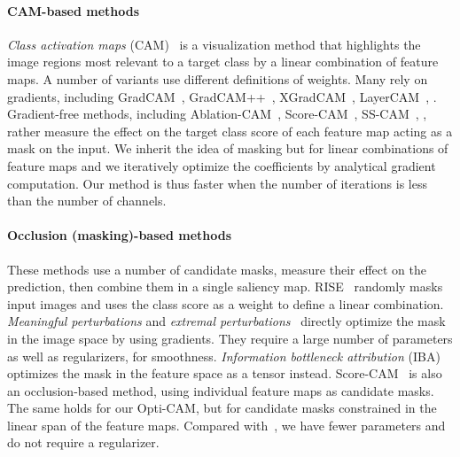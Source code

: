 
\paragraph{CAM-based methods}

\emph{Class activation maps} (CAM)~\citep{zhou2016learning} is a visualization method that highlights the image regions most relevant to a target class by a linear combination of feature maps. A number of variants use different definitions of weights. Many rely on gradients, including GradCAM~\citep{selvaraju2017grad}, GradCAM++~\citep{chattopadhay2018grad}, XGradCAM~\citep{fu2020axiom}, LayerCAM~\citep{jiang2021layercam}, . Gradient-free methods, including Ablation-CAM~\citep{ramaswamy2020ablation}, Score-CAM~\cite{wang2020score}, SS-CAM~\citep{wang2020ss}, , rather measure the effect on the target class score of each feature map acting as a mask on the input. We inherit the idea of masking but for linear combinations of feature maps and we iteratively optimize the coefficients by analytical gradient computation. Our method is thus faster when the number of iterations is less than the number of channels.


\paragraph{Occlusion (masking)-based methods}

These methods use a number of candidate masks, measure their effect on the prediction, then combine them in a single saliency map. RISE~\citep{petsiuk2018rise} randomly masks input images and uses the class score as a weight to define a linear combination. \emph{Meaningful perturbations} \citep{fong2017interpretable} and \emph{extremal perturbations}~\citep{fong2019understanding} directly optimize the mask in the image space by using gradients. They require a large number of parameters as well as regularizers, \eg for smoothness. \emph{Information bottleneck attribution} (IBA)~\citep{schulz2020restricting} optimizes the mask in the feature space as a tensor instead. Score-CAM~\cite{wang2020score} is also an occlusion-based method, using individual feature maps as candidate masks. The same holds for our Opti-CAM, but for candidate masks constrained in the linear span of the feature maps. Compared with~\citep{fong2019understanding,schulz2020restricting}, we have fewer parameters and do not require a regularizer.

